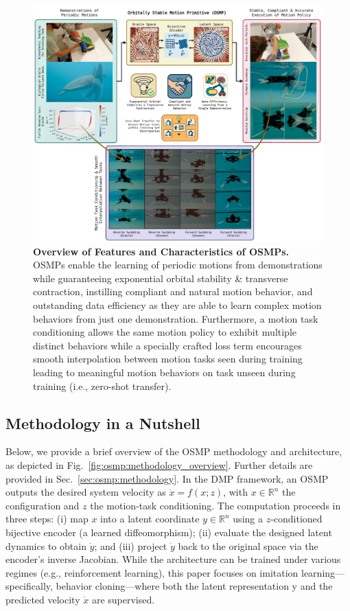 \begin{figure}[h!]
    \centering
    \includegraphics[width=1.0\linewidth]{osmp/figures/concept_overview/concept_overview_v1_compressed.pdf}
    \caption{
    \textbf{Overview of Features and Characteristics of \glspl{OSMP}.}
    OSMPs enable the learning of periodic motions from demonstrations while guaranteeing exponential orbital stability \& transverse contraction, instilling compliant and natural motion behavior, and outstanding data efficiency as they are able to learn complex motion behaviors from just one demonstration. Furthermore, a motion task conditioning allows the same motion policy to exhibit multiple distinct behaviors while a specially crafted loss term encourages smooth interpolation between motion tasks seen during training leading to meaningful motion behaviors on task unseen during training (i.e., zero-shot transfer).
    }
    \label{fig:osmp:concept_overview}
\end{figure}


\subsection{Methodology in a Nutshell}
Below, we provide a brief overview of the \gls{OSMP} methodology and architecture, as depicted in Fig.~\ref{fig:osmp:methodology_overview}. Further details are provided in Sec.~\ref{sec:osmp:methodology}. In the \gls{DMP} framework, an \gls{OSMP} outputs the desired system velocity as $\dot{x}=f(x; z)$, with $x\in\mathbb{R}^n$ the configuration and $z$ the motion-task conditioning. The computation proceeds in three steps: (i) map $x$ into a latent coordinate $y\in\mathbb{R}^n$ using a $z$-conditioned bijective encoder (a learned diffeomorphism); (ii) evaluate the designed latent dynamics to obtain $\dot{y}$; and (iii) project $\dot{y}$ back to the original space via the encoder’s inverse Jacobian. While the architecture can be trained under various regimes (e.g., reinforcement learning), this paper focuses on imitation learning—specifically, behavior cloning—where both the latent representation y and the predicted velocity $\dot{x}$ are supervised.

